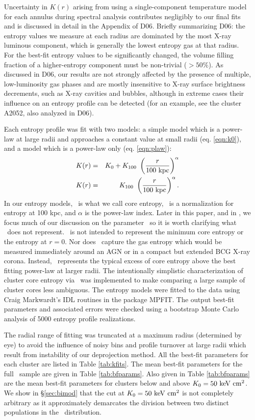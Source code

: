 \documentclass[12pt,preprint]{aastex}
\begin{document}
Uncertainty in $K(r)$ arising from using a single-component
temperature model for each annulus during spectral analysis
contributes negligibly to our final fits and is discussed in detail in
the Appendix of D06. Briefly summarizing D06: the entropy values we
measure at each radius are dominated by the most X-ray luminous
component, which is generally the lowest entropy gas at that
radius. For the best-fit entropy values to be significantly changed,
the volume filling fraction of a higher-entropy component must be
non-trivial ($> 50\%$). As discussed in D06, our results are not
strongly affected by the presence of multiple, low-luminosity gas
phases and are mostly insensitive to X-ray surface brightness
decrements, such as X-ray cavities and bubbles, although in extreme
cases their influence on an entropy profile can be detected (for an
example, see the cluster A2052, also analyzed in D06).

Each entropy profile was fit with two models: a simple model which is
a power-law at large radii and approaches a constant value at small
radii (eq. \ref{eqn:k0}), and a model which is a power-law only
(eq. \ref{eqn:plaw}):
\begin{eqnarray}
K(r) &=& K_0 + K_{100}\ \left(\frac{r}{100 \mbox{\ensuremath{\mathrm{~kpc}}}}\right)^{\alpha}\label{eqn:k0}\\
K(r) &=& K_{100}\ \left(\frac{r}{100 \mbox{\ensuremath{\mathrm{~kpc}}}}\right)^{\alpha}\label{eqn:plaw}.
\end{eqnarray}
In our entropy models, \kna\ is what we call core entropy, \khun\ is a
normalization for entropy at 100 kpc, and $\alpha$ is the power-law
index. Later in this paper, and in \citet{haradent}, we focus much of
our discussion on the parameter \kna\ so it is worth clarifying what
\kna\ does not represent. \kna\ is not intended to represent the
minimum core entropy or the entropy at $r=0$. Nor does \kna\ capture
the gas entropy which would be measured immediately around an AGN or
in a compact but extended BCG X-ray corona. Instead, \kna\ represents
the typical excess of core entropy above the best fitting power-law at
larger radii. The intentionally simplistic characterization of cluster
core entropy via \kna\ was implemented to make comparing a large
sample of cluster cores less ambiguous. The entropy models were fitted
to the data using Craig Markwardt's IDL routines in the package
MPFIT. The output best-fit parameters and associated errors were
checked using a bootstrap Monte Carlo analysis of 5000 entropy
profile realizations.

The radial range of fitting was truncated at a maximum radius
(determined by eye) to avoid the influence of noisy bins and profile
turnover at large radii which result from instability of our
deprojection method. All the best-fit parameters for each cluster are
listed in Table \ref{tab:kfits}. The mean best-fit parameters for the
full \accept\ sample are given in Table \ref{tab:bfparams}. Also given
in Table \ref{tab:bfparams} are the mean best-fit parameters for
clusters below and above $K_0 = 50 \mathrm{\mbox{\ensuremath{\mathrm{~keV}}} \mathrm{\mbox{\ensuremath{\mathrm{~cm}}}^2}}$. We show in
\S\ref{sec:bimod} that the cut at $K_0=50 \mathrm{\mbox{\ensuremath{\mathrm{~keV}}} \mathrm{\mbox{\ensuremath{\mathrm{~cm}}}^2}}$ is not completely
arbitrary as it approximately demarcates the division between two
distinct populations in the \kna\ distribution.
\end{document}
